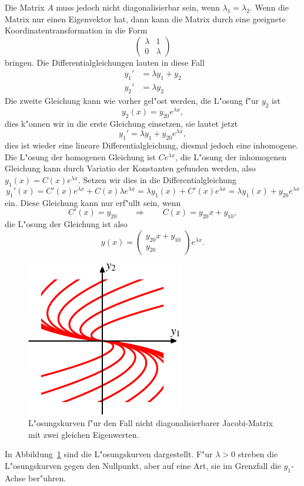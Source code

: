 Die Matrix $A$ muss jedoch nicht diagonalisierbar sein, wenn
$\lambda_1=\lambda_2$.
Wenn die Matrix nur einen Eigenvektor hat, dann kann die Matrix
durch eine geeignete Koordinatentransformation in die Form
\[
\begin{pmatrix}
\lambda&      1\\
      0&\lambda
\end{pmatrix}
\]
bringen.
Die Differentialgleichungen lauten in diese Fall
\begin{align*}
y_1'&=\lambda y_1 + y_2\\
y_2'&=\lambda y_2
\end{align*}
Die zweite Gleichung kann wie vorher gel"ost werden, die L"osung f"ur $y_2$
ist
\[
y_2(x)=y_{20}e^{\lambda x},
\]
dies k"onnen wir in die erste Gleichung einsetzen, sie lautet jetzt
\[
y_1' = \lambda y_1 + y_{20}e^{\lambda x},
\]
dies ist wieder eine lineare Differentialgleichung, diesmal jedoch
eine inhomogene. 
Die L"osung der homogenen Gleichung ist $Ce^{\lambda x}$, die L"osung
der inhomogenen Gleichung kann durch Variatio der Konstanten gefunden
werden, also $y_1(x)=C(x)e^{\lambda x}$.
Setzen wir dies in die Differentialgleichung 
\[
y_1'(x)
=
C'(x)e^{\lambda x}+C(x)\lambda e^{\lambda x}
=
\lambda y_1(x) + C'(x)e^{\lambda x}
=
\lambda y_1(x) + y_{20}e^{\lambda x}
\]
ein.
Diese Gleichung kann nur erf"ullt sein, wenn
\[
C'(x)=y_{20}
\qquad\Rightarrow\qquad
C(x)=y_{20}x+y_{10},
\]
die L"osung der Gleichung ist also
\[
y(x)=\begin{pmatrix}
y_{20}x+y_{10}\\
y_{20}
\end{pmatrix}e^{\lambda x}.
\]
\begin{figure}
\centering
\includegraphics{chapters/images/geometrie-8.pdf}
\caption{L"osungskurven f"ur den Fall nicht diagonalisierbarer Jacobi-Matrix
mit zwei gleichen Eigenwerten.
\label{geometrie:jnf-kurven}}
\end{figure}%
In Abbildung~\ref{geometrie:jnf-kurven} sind die L"osungskurven dargestellt.
F"ur $\lambda >0$ streben die L"osungskurven gegen den Nullpunkt, aber auf
eine Art, sie im Grenzfall die $y_1$-Achse ber"uhren.

